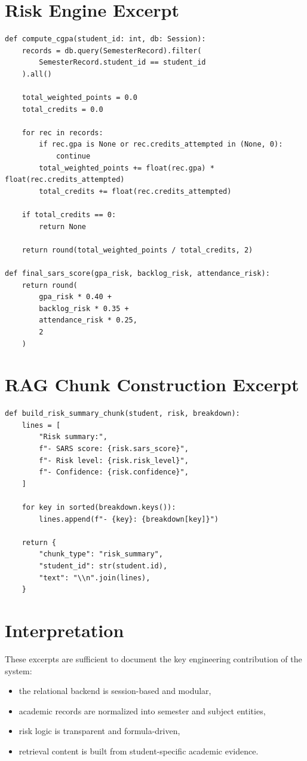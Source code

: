 \section{Risk Engine Excerpt}
\begin{lstlisting}[style=sarscode,caption={Representative SARS risk computation excerpt}]
def compute_cgpa(student_id: int, db: Session):
    records = db.query(SemesterRecord).filter(
        SemesterRecord.student_id == student_id
    ).all()

    total_weighted_points = 0.0
    total_credits = 0.0

    for rec in records:
        if rec.gpa is None or rec.credits_attempted in (None, 0):
            continue
        total_weighted_points += float(rec.gpa) * float(rec.credits_attempted)
        total_credits += float(rec.credits_attempted)

    if total_credits == 0:
        return None

    return round(total_weighted_points / total_credits, 2)

def final_sars_score(gpa_risk, backlog_risk, attendance_risk):
    return round(
        gpa_risk * 0.40 +
        backlog_risk * 0.35 +
        attendance_risk * 0.25,
        2
    )
\end{lstlisting}

\section{RAG Chunk Construction Excerpt}
\begin{lstlisting}[style=sarscode,caption={Representative student-specific RAG chunk construction excerpt}]
def build_risk_summary_chunk(student, risk, breakdown):
    lines = [
        "Risk summary:",
        f"- SARS score: {risk.sars_score}",
        f"- Risk level: {risk.risk_level}",
        f"- Confidence: {risk.confidence}",
    ]

    for key in sorted(breakdown.keys()):
        lines.append(f"- {key}: {breakdown[key]}")

    return {
        "chunk_type": "risk_summary",
        "student_id": str(student.id),
        "text": "\\n".join(lines),
    }
\end{lstlisting}

\section{Interpretation}
These excerpts are sufficient to document the key engineering contribution of the system:
\begin{itemize}[leftmargin=*]
\item the relational backend is session-based and modular,
\item academic records are normalized into semester and subject entities,
\item risk logic is transparent and formula-driven,
\item retrieval content is built from student-specific academic evidence.
\end{itemize}
